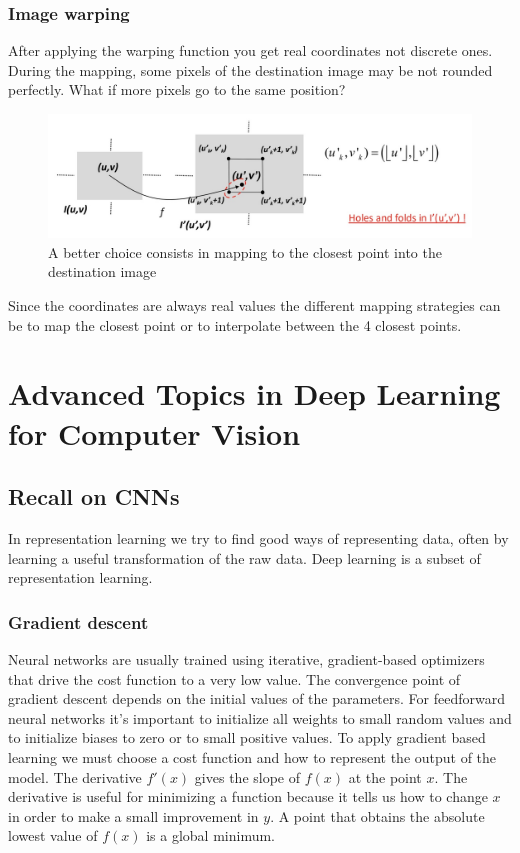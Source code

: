 \documentclass{article}
\begin{document}
\subsubsection{Image warping}


After applying the warping function you get real coordinates not discrete ones.
During the mapping, some pixels of the destination image may be not rounded perfectly.
What if more pixels go to the same position?
\begin{figure}[htbp]
  \centering
  \includegraphics[width=0.8\linewidth]{./img/forward_mapping.jpg}
  \caption{A better choice consists in mapping to the closest point into the destination image}
  \label{fig:forward_mapping}
\end{figure}

Since the coordinates are always real values the different mapping strategies can be to map the closest point or to interpolate between the 4 closest points.

\vspace{3em}
\section{Advanced Topics in Deep Learning for Computer Vision}

\subsection{Recall on CNNs}

In representation learning we try to find good ways of representing data, often by learning a useful transformation of the raw data.
Deep learning is a subset of representation learning.

\subsubsection{Gradient descent}
Neural networks are usually trained using iterative, gradient-based optimizers that drive the cost function to a very low value.
The convergence point of gradient descent depends on the initial values of the parameters.
For feedforward neural networks it's important to initialize all weights to small random values and to initialize biases to zero or to small positive values.
To apply gradient based learning we must choose a cost function and how to represent the output of the model.
The derivative $f'(x)$ gives the slope of $f(x)$ at the point $x$.
The derivative is useful for minimizing a function because it tells us how to change $x$ in order to make a small improvement in $y$.
A point that obtains the absolute lowest value of $f(x)$ is a global minimum.
\end{document}
